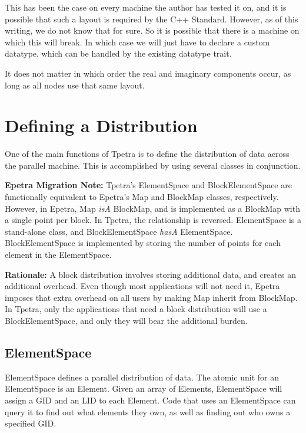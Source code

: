\documentclass[10pt,relax]{TpetraDesign}
\begin{document}
This has been the case on every machine the author has tested it on, and it is possible that such a layout is required by the C++ Standard. However, as of this writing, we do not know that for sure. So it is possible that there is a machine on which this will break. In which case we will just have to declare a custom datatype, which can be handled by the existing datatype trait.

It does not matter in which order the real and imaginary components occur, as long as all nodes use that same layout.

%
\section{Defining a Distribution}
One of the main functions of Tpetra is to define the distribution of data across the parallel machine. This is accomplished by using several classes in conjunction.

\textbf{Epetra Migration Note:} Tpetra's ElementSpace and BlockElementSpace are functionally equivalent to Epetra's Map and BlockMap classes, respectively. However, in Epetra, Map \emph{isA} BlockMap, and is implemented as a BlockMap with a single point per block. In Tpetra, the relationship is reversed. ElementSpace is a stand-alone class, and BlockElementSpace \emph{hasA} ElementSpace. BlockElementSpace is implemented by storing the number of points for each element in the ElementSpace.

\textbf{Rationale:} A block distribution involves storing additional data, and creates an additional overhead. Even though most applications will not need it, Epetra imposes that extra overhead on all users by making Map inherit from BlockMap. In Tpetra, only the applications that need a block distribution will use a BlockElementSpace, and only they will bear the additional burden.

%
\subsection{ElementSpace}
ElementSpace defines a parallel distribution of data. The atomic unit for an ElementSpace is an Element. Given an array of Elements, ElementSpace will assign a GID and an LID to each Element. Code that uses an ElementSpace can query it to find out what elements they own, as well as finding out who owns a specified GID.
\end{document}
